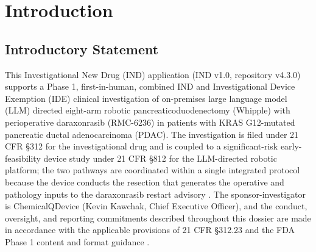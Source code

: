 \section{Introduction}

\subsection{Introductory Statement}

This Investigational New Drug (IND) application (IND v1.0, repository v4.3.0)
supports a Phase 1, first-in-human, combined IND and Investigational Device
Exemption (IDE) clinical investigation of on-premises large language model (LLM)
directed eight-arm robotic pancreaticoduodenectomy (Whipple) with perioperative
daraxonrasib (RMC-6236) in patients with KRAS G12-mutated pancreatic ductal
adenocarcinoma (PDAC). The investigation is filed under 21 CFR \S 312 for the
investigational drug and is coupled to a significant-risk early-feasibility device
study under 21 CFR \S 812 for the LLM-directed robotic platform; the two pathways
are coordinated within a single integrated protocol because the device conducts the
resection that generates the operative and pathology inputs to the daraxonrasib
restart advisory \cite{daraxwhipple, onpremwhippl}. The sponsor-investigator is
ChemicalQDevice (Kevin Kawchak, Chief Executive Officer), and the conduct,
oversight, and reporting commitments described throughout this dossier are made in
accordance with the applicable provisions of 21 CFR \S 312.23 and the FDA Phase 1
content and format guidance \cite{phase1guidance, cfr312paiuni}.

